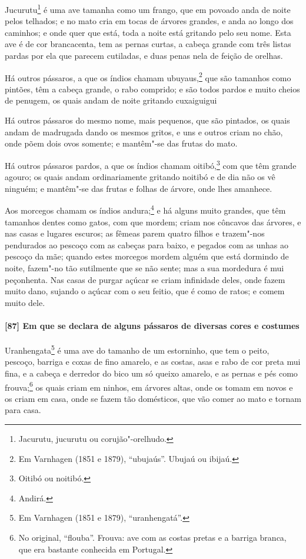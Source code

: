 \begin{linenumbers}
Jucurutu\footnote{ Jacurutu, jucurutu ou corujão"-orelhudo.} é uma ave tamanha como um
frango, que em povoado anda de noite pelos telhados; e no mato cria em tocas de árvores
grandes, e anda ao longo dos caminhos; e onde quer que está, toda a noite está gritando
pelo seu nome. Esta ave é de cor brancacenta, tem as pernas curtas, a cabeça grande com
três listas pardas por ela que parecem cutiladas, e duas penas nela de feição de orelhas.

Há outros pássaros, a que os índios chamam ubuyaus,\footnote{ Em Varnhagen (1851 e 1879),
``ubujaús''. Ubujaú ou ibijaú.} que são tamanhos como pintões, têm a cabeça grande, o
rabo comprido; e são todos pardos e muito cheios de penugem, os quais andam de noite
gritando cuxaiguigui

Há outros pássaros do mesmo nome, mais pequenos, que são pintados, os quais andam de
madrugada dando os mesmos gritos, e uns e outros criam no chão, onde põem dois ovos
somente; e mantêm"-se das frutas do mato.

Há outros pássaros pardos, a que os índios chamam oitibó,\footnote{ Oitibó ou noitibó.}
com que têm grande agouro; os quais andam ordinariamente gritando noitibó e de dia não os
vê ninguém; e mantêm"-se das frutas e folhas de árvore, onde lhes amanhece.

Aos morcegos chamam os índios andura;\footnote{ Andirá.} e há alguns muito grandes, que
têm tamanhos dentes como gatos, com que mordem; criam nos côncavos das árvores, e nas
casas e lugares escuros; as fêmeas parem quatro filhos e trazem"-nos pendurados ao pescoço
com as cabeças para baixo, e pegados com as unhas ao pescoço da mãe; quando estes morcegos
mordem alguém que está dormindo de noite, fazem"-no tão sutilmente que se não sente; mas a
sua mordedura é mui peçonhenta. Nas casas de purgar açúcar se criam infinidade deles, onde
fazem muito dano, sujando o açúcar com o seu feitio, que é como de ratos; e comem muito
dele.

\paragraph{[87] Em que se declara de alguns pássaros de diversas cores e costumes}\quad
Uranhengata\footnote{ Em Varnhagen (1851 e 1879), ``uranhengatá''.} é uma ave do tamanho
de um estorninho, que tem o peito, pescoço, barriga e coxas de fino amarelo, e as costas,
asas e rabo de cor preta mui fina, e a cabeça e derredor do bico um só queixo amarelo, e
as pernas e pés como frouva;\footnote{ No original, ``flouba''. Frouva: ave com as costas
pretas e a barriga branca, que era bastante conhecida em Portugal.} os quais criam em
ninhos, em árvores altas, onde os tomam em novos e os criam em casa, onde se fazem tão
domésticos, que vão comer ao mato e tornam para casa.


\end{linenumbers}
